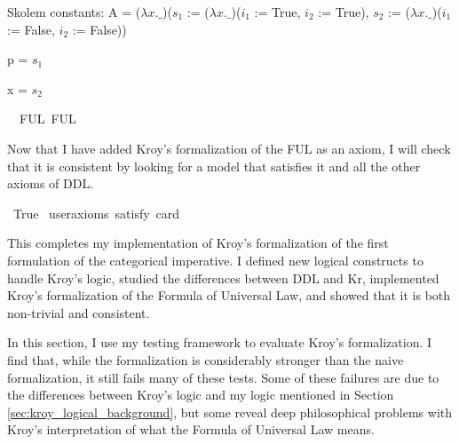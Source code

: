 \begin{isabellebody}
{  Skolem constants:
    A = ($\lambda x. \_$)($s_1$ := ($\lambda x. \_$)($i_1$ := True, $i_2$ := True), $s_2$ := ($\lambda x. \_$)($i_1$ := False, $i_2$ := False))
    
p = $s_1$
    
x = $s_2$\color{black}%
}%
\endisatagproof
{\isafoldproof}%
%
\isadelimproof
%
\endisadelimproof
\isanewline
\isanewline
{}\isamarkupfalse%
\ \ FUL{\isacharcolon}\ FUL%
\begin{isamarkuptext}%
Now that I have added Kroy's formalization of the FUL as an axiom, I will check that it is 
consistent by looking for a model that satisfies it and all the other axioms of DDL.%
\end{isamarkuptext}\isamarkuptrue%
\isamarkupfalse%
\ True\ \isamarkupfalse%
{\isacharbrackleft}user{\isacharunderscore}axioms{\isacharcomma}\ satisfy{\isacharcomma}\ card{\isacharequal}{}{\isacharbrackright}%
\isadelimproof
\ %
\endisadelimproof
%
\isatagproof
{}\isamarkupfalse%
\isanewline
%
%
\endisatagproof
{\isafoldproof}%
%
\isadelimproof
%
\endisadelimproof
%
\begin{isamarkuptext}%
This completes my implementation of Kroy's formalization of the first formulation of the 
categorical imperative. I defined new logical constructs to handle Kroy's logic, studied the differences
between DDL and Kr, implemented Kroy's formalization of the Formula of Universal Law, and showed 
that it is both non-trivial and consistent.%
\end{isamarkuptext}\isamarkuptrue%
%
\isadelimdocument
%
\endisadelimdocument
%
\isatagdocument
%
\isamarkuptrue%
%
\endisatagdocument
{\isafolddocument}%
%
\isadelimdocument
%
\endisadelimdocument
%
\begin{isamarkuptext}%
In this section, I use my testing framework to evaluate Kroy's formalization. I find that, while 
        the formalization is considerably
        stronger than the naive formalization, it still fails many of these tests. Some of these failures 
        are due to the differences between Kroy's logic and my logic mentioned in Section \ref{sec:kroy_logical_background}, but some 
        reveal deep philosophical problems with Kroy's interpretation of what the Formula of Universal Law means.


\end{isamarkuptext}
\end{isabellebody}
